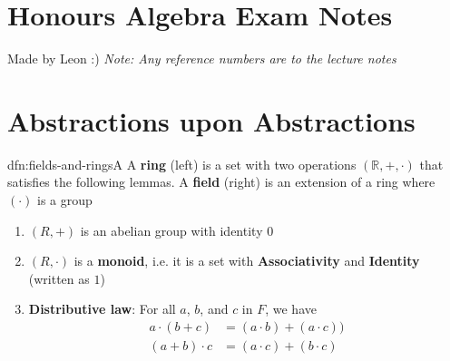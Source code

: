 \documentclass[landscape, 8pt]{extarticle}
\begin{document}
\setlength{\abovedisplayskip}{3.5pt}
\setlength{\belowdisplayskip}{3.5pt}
\setlength{\abovedisplayshortskip}{3.5pt}
\setlength{\belowdisplayshortskip}{3.5pt}

\begin{multicols}{3}
\raggedcolumns


\section*{\huge Honours Algebra Exam Notes}
Made by Leon :) \textit{Note: Any reference numbers are to the lecture notes}

\vspace{-5pt}
\section{Abstractions upon Abstractions}

\begin{dfn}{dfn:fields-and-rings}{A}
    \vspace{-7pt}
    A \textbf{ring} (left) is a set with two operations $(\mathbb{R}, +, \cdot)$ that satisfies the following lemmas.\newline
    A \textbf{field} (right) is an extension of a ring where $(\cdot)$ is a group 
    \vspace{-15pt}
    \def\columnseprulecolor{\color{black}}
    \setlength{\columnseprule}{0.5pt}
    \begin{multicols}{2}

        \begin{enumerate}[leftmargin=*]
            \setlength\itemsep{0em}
            \item $(R, +)$ is an abelian group with identity $0$
            \item $(R, \cdot)$ is a \textbf{monoid}, i.e. it is a set with \textbf{Associativity} and \textbf{Identity} (written as $1$)
            \item \textbf{Distributive law}: For all $a$, $b$, and $c$ in $F$, we have
                \begin{align*}
                    a \cdot (b + c) &= (a \cdot b) + (a \cdot c)) \\
                    (a + b) \cdot c &= (a \cdot c) + (b \cdot c)
                \end{align*}
        \end{enumerate}
        \columnbreak


\end{multicols}
\end{dfn}
\end{multicols}
\end{document}
